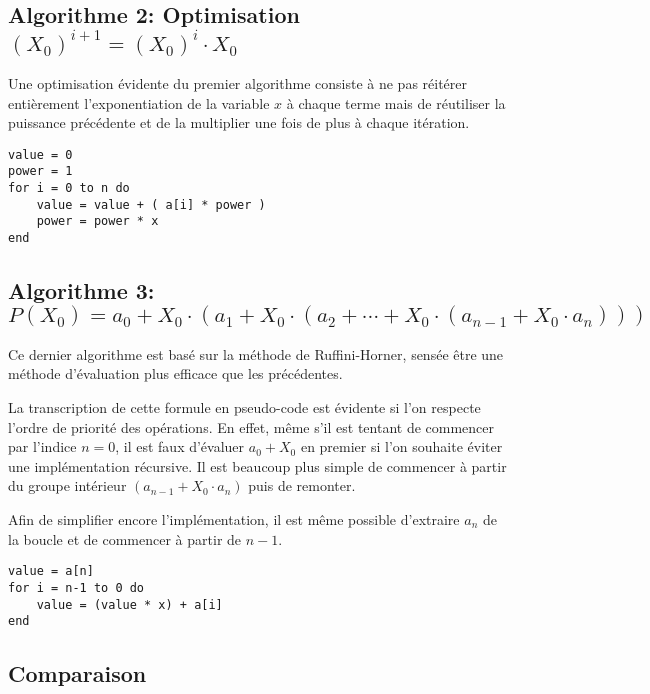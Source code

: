 \documentclass[11pt,a4paper]{article}
\begin{document}
\subsection{Algorithme 2: Optimisation $ (X_{0})^{i+1} = (X_{0})^{i} \cdot X_{0} $}

Une optimisation évidente du premier algorithme consiste à ne pas réitérer entièrement l'exponentiation de la variable $x$ à chaque terme mais de réutiliser la puissance précédente et de la multiplier une fois de plus à chaque itération.

\vspace{1em} \begin{lstlisting}
value = 0
power = 1
for i = 0 to n do
	value = value + ( a[i] * power )
	power = power * x
end
\end{lstlisting}

\subsection{Algorithme 3: $ P(X_{0}) = a_{0} + X_{0} \cdot (a_{1} + X_{0} \cdot (a_{2} + \cdots + X_{0} \cdot (a_{n-1} + X_{0} \cdot a_{n}))) $}

Ce dernier algorithme est basé sur la méthode de Ruffini-Horner, sensée être une méthode d'évaluation plus efficace que les précédentes.

La transcription de cette formule en pseudo-code est évidente si l'on respecte l'ordre de priorité des opérations. En effet, même s'il est tentant de commencer par l'indice $n = 0$, il est faux d'évaluer $a_{0} + X_{0}$ en premier si l'on souhaite éviter une implémentation récursive. Il est beaucoup plus simple de commencer à partir du groupe intérieur $(a_{n-1} + X_{0} \cdot a_{n})$ puis de remonter. 

Afin de simplifier encore l'implémentation, il est même possible d'extraire $a_{n}$ de la boucle et de commencer à partir de $n-1$.

\vspace{1em} \begin{lstlisting}
value = a[n]
for i = n-1 to 0 do
	value = (value * x) + a[i]
end
\end{lstlisting}

\subsection{Comparaison}
\end{document}
